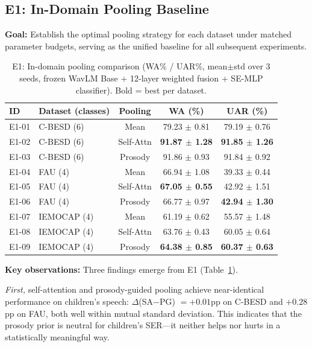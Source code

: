 \documentclass[11pt,a4paper]{article}
\begin{document}
\subsection{E1: In-Domain Pooling Baseline}
\label{ssec:e1}

\textbf{Goal:} Establish the optimal pooling strategy for each dataset under
matched parameter budgets, serving as the unified baseline for all subsequent
experiments.

\begin{table}[t]
\centering
\caption{E1: In-domain pooling comparison (WA\% / UAR\%, mean$\pm$std over 3 seeds, frozen WavLM Base + 12-layer weighted fusion + SE-MLP classifier). Bold = best per dataset.}
\label{tab:e1}
\begin{tabular}{llccc}
\toprule
\textbf{ID} & \textbf{Dataset (classes)} & \textbf{Pooling} & \textbf{WA (\%)} & \textbf{UAR (\%)} \\
\midrule
E1-01 & C-BESD (6) & Mean          & 79.23 $\pm$ 0.81 & 79.19 $\pm$ 0.76 \\
E1-02 & C-BESD (6) & Self-Attn     & \textbf{91.87 $\pm$ 1.28} & \textbf{91.85 $\pm$ 1.26} \\
E1-03 & C-BESD (6) & Prosody       & 91.86 $\pm$ 0.93 & 91.84 $\pm$ 0.92 \\
\midrule
E1-04 & FAU (4)    & Mean          & 66.94 $\pm$ 1.08 & 39.33 $\pm$ 0.44 \\
E1-05 & FAU (4)    & Self-Attn     & \textbf{67.05 $\pm$ 0.55} & 42.92 $\pm$ 1.51 \\
E1-06 & FAU (4)    & Prosody       & 66.77 $\pm$ 0.97 & \textbf{42.94 $\pm$ 1.30} \\
\midrule
E1-07 & IEMOCAP (4)& Mean          & 61.19 $\pm$ 0.62 & 55.57 $\pm$ 1.48 \\
E1-08 & IEMOCAP (4)& Self-Attn     & 63.76 $\pm$ 0.43 & 60.05 $\pm$ 0.64 \\
E1-09 & IEMOCAP (4)& Prosody       & \textbf{64.38 $\pm$ 0.85} & \textbf{60.37 $\pm$ 0.63} \\
\bottomrule
\end{tabular}
\end{table}

\noindent\textbf{Key observations:} Three findings emerge from E1 (Table~\ref{tab:e1}).

\textit{First,} self-attention and prosody-guided pooling achieve near-identical
performance on children's speech: $\Delta$(SA$-$PG) $= +0.01$pp on C-BESD and
$+0.28$pp on FAU, both well within mutual standard deviation. This indicates
that the prosody prior is neutral for children's SER---it neither helps nor
hurts in a statistically meaningful way.
\end{document}
